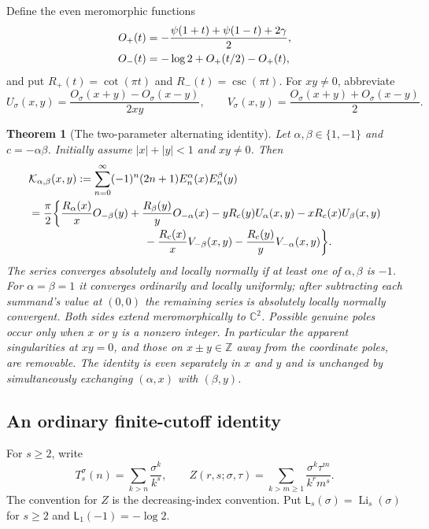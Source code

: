\documentclass[11pt]{article}
\newtheorem{theorem}{Theorem}[section]
\theoremstyle{definition}
\theoremstyle{remark}
\numberwithin{equation}{section}
\begin{document}
Define the even meromorphic functions
\begin{align}
 O_+(t)&=-\frac{\psi(1+t)+\psi(1-t)+2\gamma}{2},
 \label{alt:eq:O}\\
 O_-(t)&=-\log2+O_+(t/2)-O_+(t),\notag
\end{align}
and put $R_+(t)=\cot(\pi t)$ and $R_-(t)=\csc(\pi t)$.
For $xy\ne0$, abbreviate
\begin{equation}\label{alt:eq:UV}
 U_\sigma(x,y)=\frac{O_\sigma(x+y)-O_\sigma(x-y)}{2xy},
 \qquad
 V_\sigma(x,y)=\frac{O_\sigma(x+y)+O_\sigma(x-y)}2.
\end{equation}

\begin{theorem}[The two-parameter alternating identity]
\label{alt:thm:master}
Let $\alpha,\beta\in\{1,-1\}$ and $c=-\alpha\beta$. Initially assume
$|x|+|y|<1$ and $xy\ne0$. Then
\begin{align}
 &\mathcal K_{\alpha,\beta}(x,y)
 :=\sum_{n=0}^\infty(-1)^n(2n+1)E_n^\alpha(x)E_n^\beta(y)
 \notag\\
 &=\frac\pi2\bigg\{
 \frac{R_\alpha(x)}xO_{-\beta}(y)
 +\frac{R_\beta(y)}yO_{-\alpha}(x)
 -yR_c(y)U_\alpha(x,y)-xR_c(x)U_\beta(x,y)
 \notag\\[-2pt]
 &\hspace{37mm}
 -\frac{R_c(x)}xV_{-\beta}(x,y)
 -\frac{R_c(y)}yV_{-\alpha}(x,y)\bigg\}.
 \label{alt:eq:master}
\end{align}
The series converges absolutely and locally normally if at least one of
$\alpha,\beta$ is $-1$. For $\alpha=\beta=1$ it converges ordinarily
and locally uniformly; after subtracting each summand's value at
$(0,0)$ the remaining series is absolutely locally normally
convergent. Both sides extend meromorphically to $\mathbb C^2$.
Possible genuine poles occur only when $x$ or $y$ is a nonzero integer.
In particular the apparent singularities at $xy=0$, and those on
$x\pm y\in\mathbb Z$ away from the coordinate poles, are removable.
The identity is even separately in $x$ and $y$ and is unchanged by
simultaneously exchanging $(\alpha,x)$ with $(\beta,y)$.
\end{theorem}

\subsection{An ordinary finite-cutoff identity}

For $s\ge2$, write
\[
 T_s^\sigma(n)=\sum_{k>n}\frac{\sigma^k}{k^s},\qquad
 Z(r,s;\sigma,\tau)
 =\sum_{k>m\ge1}\frac{\sigma^k\tau^m}{k^r m^s}.
\]
The convention for $Z$ is the decreasing-index convention. Put
$\mathsf L_s(\sigma)=\operatorname{Li}_s(\sigma)$ for $s\ge2$ and
$\mathsf L_1(-1)=-\log2$.
\end{document}
